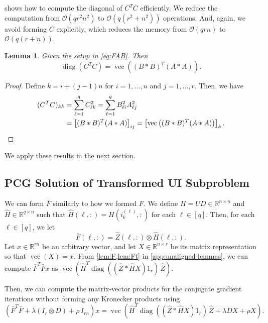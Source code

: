 \documentclass{article}
\DeclareMathOperator{\vecop}{vec}
\DeclareMathOperator{\diag}{diag}
\theoremstyle{plain} %
\newtheorem{lemma}{Lemma}
\begin{document}
 shows how to compute the diagonal of $C^T C$ efficiently.
We reduce the computation from $\mathcal{O}(q r^2 n^2)$ to $\mathcal{O}(q(r^2 + n^2))$ operations.
And, again, we avoid forming $C$ explicitly, which reduces the memory from $\mathcal{O}(q r n)$ to $\mathcal{O}(q (r + n))$.

\begin{lemma}\label{lem:FtF}
    Given the setup in \cref{eq:FAB}. Then
    \begin{displaymath}
        \diag(C^TC) =
        \vecop\left((B \ast B)^T (A \ast A)\right).
    \end{displaymath}
\end{lemma}

\begin{proof}
    Define $k = i + (j-1)n$ for $i=1,\ldots,n$ and $j=1,\ldots,r$. Then, we have
    \begin{align*}
        (C^TC)_{kk} 
        & = \sum_{\ell=1}^q C_{\ell k}^2 
        = \sum_{\ell=1}^q B_{\ell i}^2 A_{\ell j}^2 \\
        & = \left[(B \ast B)^T (A \ast A)\right]_{ij}
        = \left[\vecop \left((B \ast B)^T (A \ast A)\right) \right]_{k}.    \qedhere   
    \end{align*}
\end{proof}

We apply these results in the next section.

\subsection{PCG Solution of Transformed UI Subproblem}
\label{sec:pcg-ui}
We can form $\bar{F}$ similarly to how we formed $F$.
We define $H = UD \in \mathbb{R}^{n \times n}$
and $\hat{H} \in \mathbb{R}^{q \times n}$ such that $\hat{H}(\ell,:) = H(i_k^{(\ell)},:)$ for each $\ell \in [q]$.
Then, for each $\ell \in [q]$, we let
\begin{equation}
    \bar{F}(\ell,:) = \hat{Z}(\ell,:) \otimes \hat{H}(\ell,:).
\end{equation}
Let $x \in \mathbb{R}^{rn}$ be an arbitrary vector, and let $X \in \mathbb{R}^{n \times r}$ be its matrix representation
so that $\vecop(X) = x$.
From \cref{lem:F,lem:Ft} in \cref{app:unaligned-lemmas}, we can compute 
$\bar{F}^T \bar{F} x$ as $\vecop \left(\hat{H}^T
\diag \left( (\hat{Z} \ast \hat{H} X) 1_{r} \right) \, \hat{Z}\right)$.

Then, we can compute the matrix-vector products for the conjugate gradient iterations without forming any Kronecker products
using
\begin{equation}\label{eq:pcg-matvec-ui}
    \left(\bar{F}^T \bar{F} + \lambda (I_r \otimes D) + \rho \, I_{rn}\right) x =
    \vecop \left(
        \hat{H}^T          
        \diag \left( (\hat{Z} \ast \hat{H} X) 1_{r} \right)
        \, \hat{Z}
        +
        \lambda D X + \rho X
    \right).
\end{equation}
\end{document}

